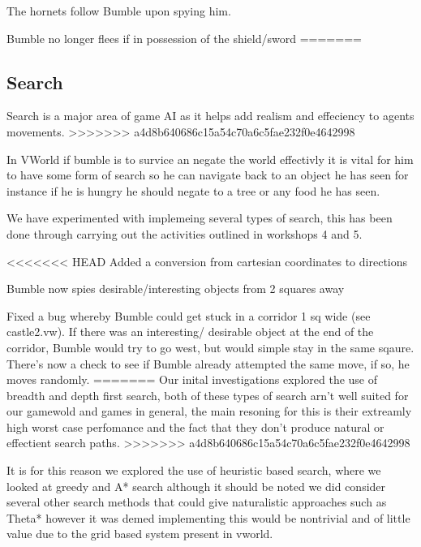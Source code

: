 \documentclass[a4paper,oneside]{report}
\begin{document}
The hornets follow Bumble upon spying him.

Bumble no longer flees if in possession of the shield/sword
=======
	\subsection{Search}
	
		Search is a major area of game AI as it helps add realism and effeciency to agents movements.
>>>>>>> a4d8b640686c15a54c70a6c5fae232f0e4642998

In VWorld if bumble is to survice an negate the world effectivly it is vital for him to have some form of search so he can navigate back to an object he has seen for instance if he is hungry he should negate to a tree or any food he has seen. 

We have experimented with implemeing several types of search, this has been done through carrying out the activities outlined in workshops 4 and 5. 

<<<<<<< HEAD
Added a conversion from cartesian coordinates to directions

Bumble now spies desirable/interesting objects from 2 squares away

Fixed a bug whereby Bumble could get stuck in a corridor 1 sq wide (see castle2.vw). 
If there was an interesting/ desirable object at the end of the corridor, Bumble would try to go west, but would simple stay in the same sqaure. There's now a check to see if Bumble already attempted the same move, if so, he moves randomly.
=======
Our inital investigations explored the use of breadth and depth first search, both of these types of search arn't well suited for our gamewold and games in general, the main resoning for this is their extreamly high worst case perfomance and the fact that they don't produce natural  or effectient search paths. 
>>>>>>> a4d8b640686c15a54c70a6c5fae232f0e4642998

It is for this reason we explored the use of heuristic based search, where we looked at greedy and A* search although it should be noted we did consider several other search methods that could give naturalistic approaches such as Theta* however it was demed implementing this would be nontrivial and of little value due to the grid based system present in vworld. 
\end{document}
